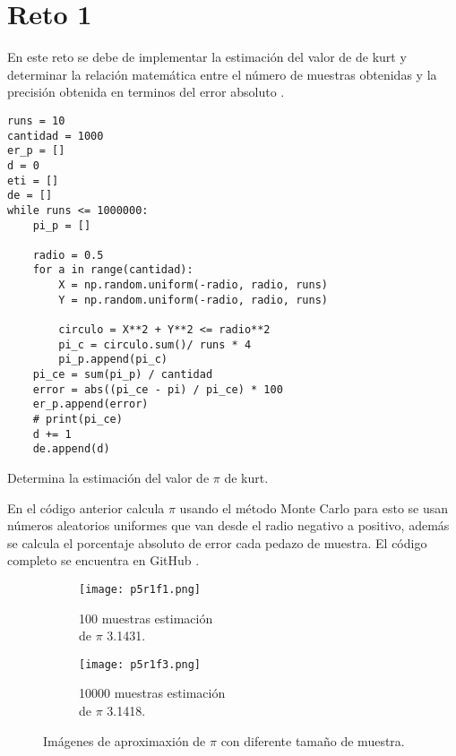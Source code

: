 \documentclass{article}
\begin{document}
\section{Reto 1}
En este reto se debe de implementar la estimación del valor de de kurt y determinar la relación matemática entre el número de muestras obtenidas y la precisión obtenida en terminos del error absoluto \cite{Satu_Elisa_Schaeffer}.

\renewcommand{\listingscaption}{Código}
\begin{listing}[H]
  \begin{verbatim}
runs = 10
cantidad = 1000
er_p = []
d = 0
eti = []
de = []
while runs <= 1000000:
    pi_p = []

    radio = 0.5
    for a in range(cantidad):
        X = np.random.uniform(-radio, radio, runs)
        Y = np.random.uniform(-radio, radio, runs) 
        
        circulo = X**2 + Y**2 <= radio**2
        pi_c = circulo.sum()/ runs * 4
        pi_p.append(pi_c)
    pi_ce = sum(pi_p) / cantidad
    error = abs((pi_ce - pi) / pi_ce) * 100   
    er_p.append(error)
    # print(pi_ce)
    d += 1
    de.append(d)
      \end{verbatim}
  \label{lst:fibo}
  \caption{Determina la estimación del valor de $\pi$ de kurt.}
\end{listing}
\newpage
En el código anterior calcula $\pi$ usando el método Monte Carlo para esto se usan números aleatorios uniformes \cite{Librería_Reto1} que van desde el radio negativo a positivo, además se calcula el porcentaje absoluto de error cada pedazo de muestra. El código completo se encuentra en GitHub \cite{Denisse_Leyva}.

\begin{figure}[H]
\centering
\begin{subfigure}[b]{0.35\linewidth}
\texttt{[image: p5r1f1.png]}
\caption{100 muestras estimación\\ de $\pi$ 3.1431.}
\end{subfigure}
\begin{subfigure}[b]{0.35\linewidth}
\texttt{[image: p5r1f3.png]}
\caption{10000 muestras estimación \\ de $\pi$ 3.1418.}
\end{subfigure}
\caption{Imágenes de aproximaxión de $\pi$ con diferente tamaño de muestra.}
\label{fig:westminster}
\end{figure}
\end{document}
